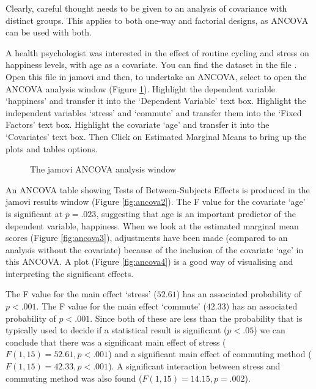 Clearly, careful thought needs to be given to an analysis of covariance with distinct groups. This applies to both one-way and factorial designs, as ANCOVA can be used with both.


A health psychologist was interested in the effect of routine cycling and stress on happiness levels, with age as a covariate. You can find the dataset in the file . Open this file in jamovi and then, to undertake an ANCOVA, select    to open the ANCOVA analysis window (Figure \ref{fig:ancova1}). Highlight the dependent variable ‘happiness’ and transfer it into the ‘Dependent Variable’ text box. Highlight the independent variables  ‘stress’ and ‘commute’ and transfer them  into the ‘Fixed Factors’ text box. Highlight the covariate ‘age’ and transfer it  into the ‘Covariates’ text box. Then Click on Estimated Marginal Means to bring up the plots and tables options. 

\begin{figure}[!htb]
\begin{center}
\caption{The jamovi ANCOVA analysis window}
\label{fig:ancova1}
\HR
\end{center}
\end{figure}

An ANCOVA table showing Tests of Between-Subjects Effects is produced in the jamovi results window (Figure \ref{fig:ancova2}). The F value for the covariate ‘age’ is significant at $p=.023$, suggesting that age is an important predictor of the dependent variable, happiness. When we look at the estimated marginal mean scores (Figure \ref{fig:ancova3}), adjustments have been made (compared to an analysis without the covariate) because of the inclusion of the covariate ‘age’ in this ANCOVA. A plot (Figure \ref{fig:ancova4}) is a good way of visualising and interpreting the significant effects. 

The F value for the main effect ‘stress’ ($52.61$) has an associated probability of $p<.001$. The F value for the main effect ‘commute’ ($42.33$) has an associated probability of $p<.001$. Since both of these are less than the probability that is typically used to decide if a statistical result is significant ($p<.05$) we can conclude that there was a significant main effect of stress ($F(1,15)=52.61, p<.001$) and a significant main effect of commuting method ($F(1,15)=42.33, p<.001$). A significant interaction between stress and commuting method was also found ($F(1,15)=14.15, p=.002$).

